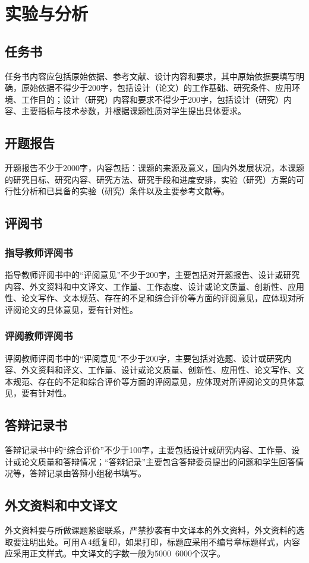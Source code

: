 \chapter{实验与分析}

\section{任务书}

任务书内容应包括原始依据、参考文献、设计内容和要求，其中原始依据要填写明确，原始依据不得少于200字，包括设计（论文）的工作基础、研究条件、应用环境、工作目的；设计（研究）内容和要求不得少于200字，包括设计（研究）内容、主要指标与技术参数，并根据课题性质对学生提出具体要求。

\section{开题报告}

开题报告不少于2000字，内容包括：课题的来源及意义，国内外发展状况，本课题的研究目标、研究内容、研究方法、研究手段和进度安排，实验（研究）方案的可行性分析和已具备的实验（研究）条件以及主要参考文献等。

\section{评阅书}

\subsection{指导教师评阅书}

指导教师评阅书中的“评阅意见”不少于200字，主要包括对开题报告、设计或研究内容、外文资料和中文译文、工作量、工作态度、设计或论文质量、创新性、应用性、论文写作、文本规范、存在的不足和综合评价等方面的评阅意见，应体现对所评阅论文的具体意见，要有针对性。

\subsection{评阅教师评阅书}

评阅教师评阅书中的“评阅意见”不少于200字，主要包括对选题、设计或研究内容、外文资料和译文、工作量、设计或论文质量、创新性、应用性、论文写作、文本规范、存在的不足和综合评价等方面的评阅意见，应体现对所评阅论文的具体意见，要有针对性。

\section{答辩记录书}

答辩记录书中的“综合评价”不少于100字，主要包括设计或研究内容、工作量、设计或论文质量和答辩情况；“答辩记录”主要包含答辩委员提出的问题和学生回答情况等，答辩记录由答辩小组秘书填写。

\section{外文资料和中文译文}

外文资料要与所做课题紧密联系，严禁抄袭有中文译本的外文资料，外文资料的选取要注明出处。可用Ａ4纸复印，如果打印，标题应采用不编号章标题样式，内容应采用正文样式。中文译文的字数一般为5000~6000个汉字。

\clearpage
